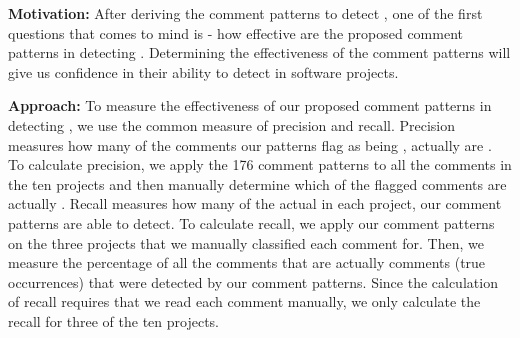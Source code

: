 \rqii

\noindent \textbf{Motivation:} After deriving the comment patterns to detect \SADTD, one of the first questions that comes to mind is - how effective are the proposed comment patterns in detecting \SADTD. Determining the effectiveness of the comment patterns will give us confidence in their ability to detect \SADTD in software projects.


\par \noindent \textbf{Approach:} To measure the effectiveness of our proposed comment patterns in detecting \SADTD, we use the common measure of precision and recall. Precision measures how many of the comments our patterns flag as being \SADTD, actually are \SADTD. To calculate precision, we apply the 176 comment patterns to all the comments in the ten projects and then manually determine which of the flagged comments are actually \SADTD. Recall measures how many of the actual \SADTD in each project, our comment patterns are able to detect. To calculate recall, we apply our comment patterns on the three projects that we manually classified each comment for. Then, we measure the percentage of all the comments that are actually \SADTD comments (true occurrences) that were detected by our comment patterns. Since the calculation of recall requires that we read each comment manually, we only calculate the recall for three of the ten projects.





